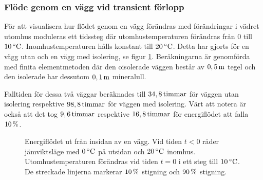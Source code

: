 \subsubsection{Flöde genom en vägg vid transient förlopp}


För att visualisera hur flödet genom en vägg förändras med förändringar i vädret utomhus moduleras ett tidssteg där utomhustemperaturen förändras från 0 till $\unit[10]{^\circ C}$. Inomhustemperaturen hålls konstant till $\unit[20]{^\circ C}$. Detta har gjorts för en vägg utan och en vägg med isolering, se figur \ref{fig:energyflow_trans}. Beräkningarna är genomförda med finita elementmetoden där den oisolerade väggen består av $\unit[0,5]{m}$ tegel och den isolerade har dessutom $\unit[0,1]{m}$ mineralull.

Falltiden för dessa två väggar beräknades till $\unit[34,8]{timmar}$ för väggen utan isolering respektive $\unit[98,8]{timmar}$ för väggen med isolering. 
Värt att notera är också att det tog $\unit[9,6]{timmar}$ respektive $\unit[16,8]{timmar}$ för energiflödet att falla $\unit[10]{\%}$. 


\begin{figure}[hpbt]
\centering

\vspace{5mm}
\caption{\label{fig:energyflow_trans} Energiflödet ut från insidan av en vägg. Vid tiden $t<0$ råder jämviktsläge med $\unit[0]{^\circ C}$ på utsidan och $\unit[20]{^\circ C}$ inomhus. Utomhustemperaturen förändras vid tiden $t=0$ i ett steg till $\unit[10]{^\circ C}$. De streckade linjerna markerar $\unit[10]{\%}$ stigning och $\unit[90]{\%}$ stigning.}

\end{figure}


